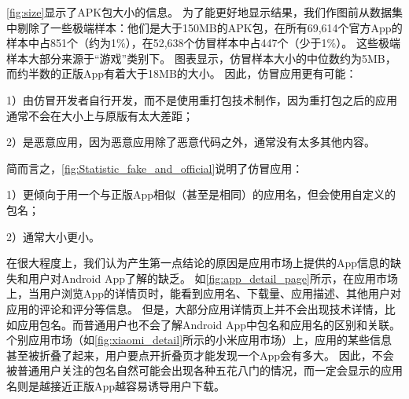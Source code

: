 \autoref{fig:size}显示了APK包大小的信息。
为了能更好地显示结果，我们作图前从数据集中剔除了一些极端样本：他们是大于150MB的APK包，在所有69,614个官方App的样本中占851个（约为1\%），在52,638个仿冒样本中占447个（少于1\%）。
这些极端样本大部分来源于``游戏''类别下。
图表显示，仿冒样本大小的中位数约为5MB，而约半数的正版App有着大于18MB的大小。
因此，仿冒应用更有可能：

1）由仿冒开发者自行开发，而不是使用重打包技术制作，因为重打包之后的应用通常不会在大小上与原版有太大差距；

2）是恶意应用，因为恶意应用除了恶意代码之外，通常没有太多其他内容。
\vspace{1mm}

简而言之，\autoref{fig:Statistic_fake_and_official}说明了仿冒应用：

1）更倾向于用一个与正版App相似（甚至是相同）的应用名，但会使用自定义的包名；

2）通常大小更小。
\vspace{1mm}

在很大程度上，我们认为产生第一点结论的原因是应用市场上提供的App信息的缺失和用户对Android App了解的缺乏。
如\autoref{fig:app_detail_page}所示，在应用市场上，当用户浏览App的详情页时，能看到应用名、下载量、应用描述、其他用户对应用的评论和评分等信息。
但是，大部分应用详情页上并不会出现技术详情，比如应用包名。而普通用户也不会了解Android App中包名和应用名的区别和关联。
个别应用市场（如\autoref{fig:xiaomi_detail}所示的小米应用市场）上，应用的某些信息甚至被折叠了起来，用户要点开折叠页才能发现一个App会有多大。
因此，不会被普通用户关注的包名自然可能会出现各种五花八门的情况，而一定会显示的应用名则是越接近正版App越容易诱导用户下载。

